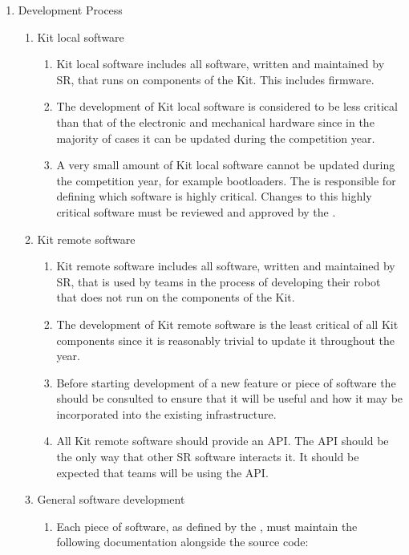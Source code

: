 \begin{draft}
\begin{enumerate}

\item Development Process
  \begin{enumerate}
    \item Kit local software
      \begin{enumerate}
        \item Kit local software includes all software, written and maintained by SR, that runs on components of the Kit. This includes firmware.
        \item The development of Kit local software is considered to be less critical than that of the electronic and mechanical hardware since in the majority of cases it can be updated during the competition year.
        \item A very small amount of Kit local software cannot be updated during the competition year, for example bootloaders. The  is responsible for defining which software is highly critical. Changes to this highly critical software must be reviewed and approved by the .
      \end{enumerate}
    \item Kit remote software
      \begin{enumerate}
        \item Kit remote software includes all software, written and maintained by SR, that is used by teams in the process of developing their robot that does not run on the components of the Kit.
        \item The development of Kit remote software is the least critical of all Kit components since it is reasonably trivial to update it throughout the year.
        \item Before starting development of a new feature or piece of software the  should be consulted to ensure that it will be useful and how it may be incorporated into the existing infrastructure.
        \item All Kit remote software should provide an API. The API should be the only way that other SR software interacts it. It should be expected that teams will be using the API.
      \end{enumerate}
    \item General software development
      \begin{enumerate}
        \item Each piece of software, as defined by the , must maintain the following documentation alongside the source code:

\end{enumerate}
\end{enumerate}
\end{enumerate}
\end{draft}
